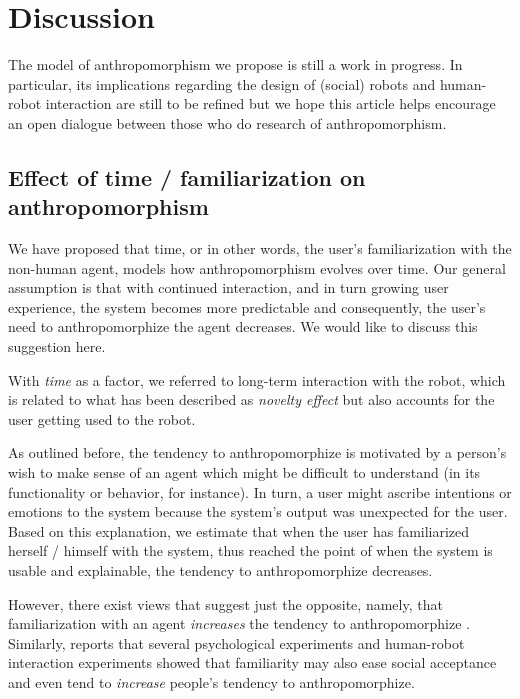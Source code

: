 \documentclass{frontiersSCNS} %
\begin{document}

\section{Discussion}
\label{sec:discussion}

The model of anthropomorphism we propose is still a work in progress. In
particular, its implications regarding the design of (social) robots and
human-robot interaction are still to be refined but we hope this article helps encourage an open dialogue between those who do research of anthropomorphism.

\subsection{Effect of time / familiarization on anthropomorphism}


We have proposed that time, or in other words, the user's familiarization with the non-human agent, models how anthropomorphism evolves over time. Our general assumption is that with continued interaction, and in turn growing user experience, the system becomes more predictable and consequently, the user's need to anthropomorphize the agent decreases. We would like to discuss this suggestion here.

With \textit{time} as a factor, we
referred to long-term interaction with the robot, which is related to what has been
described as \textit{novelty effect} but also accounts for the user getting used
to the robot. 

As outlined before, the tendency to anthropomorphize is motivated by
a person's wish to make sense of an agent which might be difficult to understand
(in its functionality or behavior, for instance). In turn, a user might ascribe
intentions or emotions to the system because the system's output was unexpected
for the user. Based on this explanation, we estimate that when the user has
familiarized herself / himself with the system, thus reached the point of when
the system is usable and explainable, the tendency to anthropomorphize
decreases. 

However, there exist views that suggest just the opposite, namely, that familiarization with an agent \textit{increases} the tendency to anthropomorphize \citep{eddy_attribution_1993}. Similarly, \cite{duffy_anthropomorphism_2003} reports that several psychological experiments and human-robot interaction experiments showed that familiarity may also ease social acceptance and even tend to \textit{increase} people's tendency to anthropomorphize.
\end{document}
